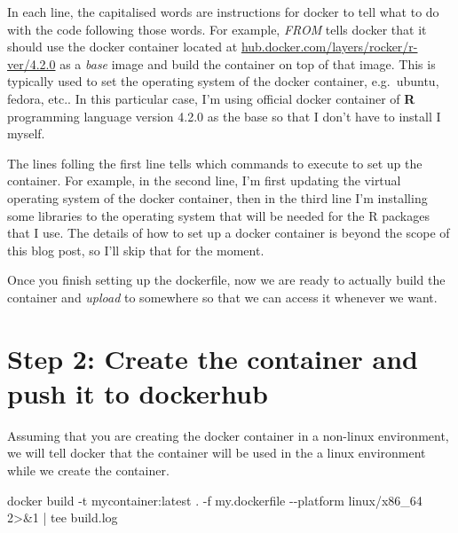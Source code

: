 \documentclass[
  letterpaper,
  DIV=11,
  numbers=noendperiod]{scrartcl}
\newenvironment{Shaded}{\begin{snugshade}}{\end{snugshade}}
\newcommand{\AttributeTok}[1]{\textcolor[rgb]{0.40,0.45,0.13}{#1}}
\newcommand{\DecValTok}[1]{\textcolor[rgb]{0.68,0.00,0.00}{#1}}
\newcommand{\ExtensionTok}[1]{\textcolor[rgb]{0.00,0.23,0.31}{#1}}
\newcommand{\FunctionTok}[1]{\textcolor[rgb]{0.28,0.35,0.67}{#1}}
\newcommand{\KeywordTok}[1]{\textcolor[rgb]{0.00,0.23,0.31}{#1}}
\newcommand{\NormalTok}[1]{\textcolor[rgb]{0.00,0.23,0.31}{#1}}
\newcommand{\OperatorTok}[1]{\textcolor[rgb]{0.37,0.37,0.37}{#1}}
\begin{document}
In each line, the capitalised words are instructions for docker to tell
what to do with the code following those words. For example, \emph{FROM}
tells docker that it should use the docker container located at
\href{https://hub.docker.com/layers/rocker/r-ver/4.2.0/images/sha256-53e27eaf50320246234dc960c19143161797b721b67d69f4fd4c2a5157b23b54?context=explore}{hub.docker.com/layers/rocker/r-ver/4.2.0}
as a \emph{base} image and build the container on top of that image.
This is typically used to set the operating system of the docker
container, e.g.~ubuntu, fedora, etc.. In this particular case, I'm using
official docker container of \textbf{R} programming language version
4.2.0 as the base so that I don't have to install I myself.

The lines folling the first line tells which commands to execute to set
up the container. For example, in the second line, I'm first updating
the virtual operating system of the docker container, then in the third
line I'm installing some libraries to the operating system that will be
needed for the R packages that I use. The details of how to set up a
docker container is beyond the scope of this blog post, so I'll skip
that for the moment.

Once you finish setting up the dockerfile, now we are ready to actually
build the container and \emph{upload} to somewhere so that we can access
it whenever we want.

\hypertarget{step-2-create-the-container-and-push-it-to-dockerhub}{%
\section{Step 2: Create the container and push it to
dockerhub}\label{step-2-create-the-container-and-push-it-to-dockerhub}}

Assuming that you are creating the docker container in a non-linux
environment, we will tell docker that the container will be used in the
a linux environment while we create the container.

\begin{Shaded}
\begin{Highlighting}[]
\ExtensionTok{docker}\NormalTok{ build }\AttributeTok{{-}t}\NormalTok{ mycontainer:latest . }\AttributeTok{{-}f}\NormalTok{ my.dockerfile  }\AttributeTok{{-}{-}platform}\NormalTok{ linux/x86\_64 }\DecValTok{2}\OperatorTok{\textgreater{}\&}\DecValTok{1} \KeywordTok{|} \FunctionTok{tee}\NormalTok{ build.log}
\end{Highlighting}
\end{Shaded}
\end{document}
